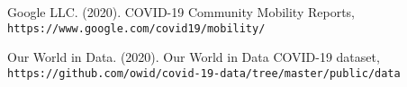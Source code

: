 \begin{thebibliography}{9}

Google LLC. (2020). COVID-19 Community Mobility Reports,
\\\texttt{https://www.google.com/covid19/mobility/}

Our World in Data. (2020). Our World in Data COVID-19 dataset,
\\\texttt{https://github.com/owid/covid-19-data/tree/master/public/data}
\end{thebibliography}